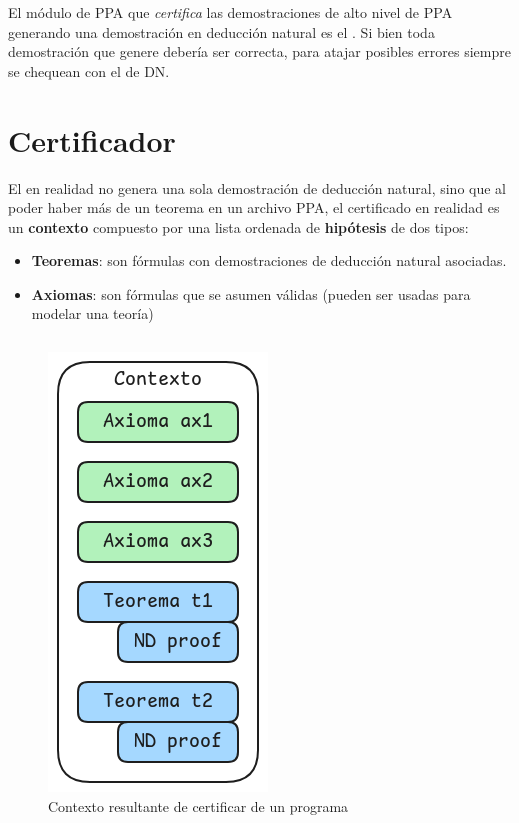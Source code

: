 El módulo de PPA que \textit{certifica} las demostraciones de alto nivel de PPA
generando una demostración en deducción natural es el \modCertifier{}. Si
bien toda demostración que genere debería ser correcta, para atajar posibles
errores siempre se chequean con el \modChecker{} de DN.



\section{Certificador}

El \modCertifier{} en realidad no genera una sola demostración de deducción
natural, sino que al poder haber más de un teorema en un archivo PPA, el
certificado en realidad es un \textbf{contexto} compuesto por una lista ordenada
de \textbf{hipótesis} de dos tipos:

\begin{itemize}
    \item \textbf{Teoremas}: son fórmulas con demostraciones de deducción natural
    asociadas.
    \item \textbf{Axiomas}: son fórmulas que se asumen válidas (pueden ser usadas para
    modelar una teoría)
\end{itemize}

\begin{figure}[H]
    \centering
    \begin{multicols}{2}
        \begin{tabular}{c}
            
        \end{tabular}
        \includegraphics[scale=0.5]{img/ppa-context.png}
    \end{multicols}
    \caption{Contexto resultante de certificar de un programa}
\end{figure}


